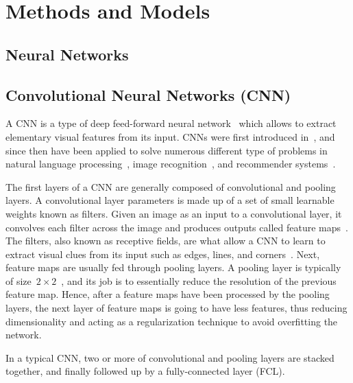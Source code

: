 \section{Methods and Models}

\subsection{Neural Networks}

\subsection{Convolutional Neural Networks (CNN)}

A CNN is a type of deep feed-forward neural network~\cite{cnn-star-galaxy} which allows to extract elementary visual features from its input. CNNs were first introduced in~\cite{Lecun99objectrecognition}, and since then have been applied to solve numerous different type of problems in  natural language processing~\cite{Collobert:2008:UAN:1390156.1390177}, image recognition~\cite{cnn-star-galaxy}, and recommender systems~\cite{NIPS2013_5004}.

The first layers of a CNN are generally composed of convolutional and pooling layers. A convolutional layer parameters is made up of a set of small learnable weights known as filters. Given an image as an input to a convolutional layer, it convolves each filter across the image and produces outputs called feature maps~\cite{cnn-star-galaxy}. The filters, also known as receptive fields, are what allow a CNN to learn to extract visual clues from its input such as edges, lines, and corners~\cite{Lecun99objectrecognition}. Next, feature maps are usually fed through pooling layers. A pooling layer is typically of size~$2 \times 2$~\cite{NIPS2012_4824}, and  its job is to essentially reduce the resolution of the previous feature map. Hence, after a feature maps have been processed by the pooling layers, the next layer of feature maps is going to have less features, thus reducing dimensionality and acting as a regularization technique to avoid overfitting the network.

In a typical CNN, two or more of convolutional and pooling layers are stacked together, and finally followed up by a fully-connected layer (FCL).

